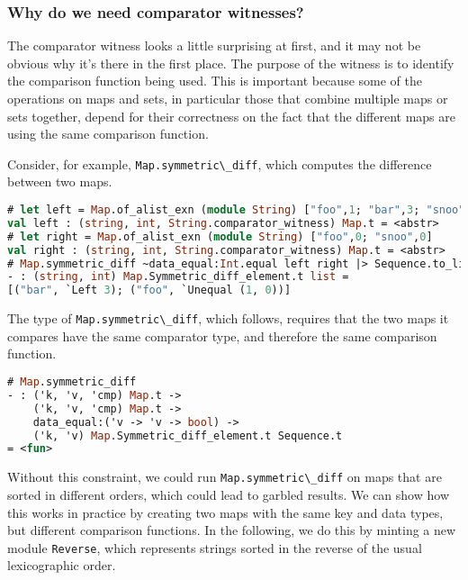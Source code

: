 \hypertarget{why-comparator-witnesses}{%
\subsubsection{Why do we need comparator
witnesses?}\label{why-comparator-witnesses}}

The comparator witness looks a little surprising at first, and it may
not be obvious why it's there in the first place. The purpose of the
witness is to identify the comparison function being used. This is
important because some of the operations on maps and sets, in particular
those that combine multiple maps or sets together, depend for their
correctness on the fact that the different maps are using the same
comparison function.

Consider, for example, \passthrough{\lstinline!Map.symmetric\_diff!},
which computes the difference between two maps.

\begin{lstlisting}[language=Caml]
# let left = Map.of_alist_exn (module String) ["foo",1; "bar",3; "snoo",0]
val left : (string, int, String.comparator_witness) Map.t = <abstr>
# let right = Map.of_alist_exn (module String) ["foo",0; "snoo",0]
val right : (string, int, String.comparator_witness) Map.t = <abstr>
# Map.symmetric_diff ~data_equal:Int.equal left right |> Sequence.to_list
- : (string, int) Map.Symmetric_diff_element.t list =
[("bar", `Left 3); ("foo", `Unequal (1, 0))]
\end{lstlisting}

The type of \passthrough{\lstinline!Map.symmetric\_diff!}, which
follows, requires that the two maps it compares have the same comparator
type, and therefore the same comparison function.

\begin{lstlisting}[language=Caml]
# Map.symmetric_diff
- : ('k, 'v, 'cmp) Map.t ->
    ('k, 'v, 'cmp) Map.t ->
    data_equal:('v -> 'v -> bool) ->
    ('k, 'v) Map.Symmetric_diff_element.t Sequence.t
= <fun>
\end{lstlisting}

Without this constraint, we could run
\passthrough{\lstinline!Map.symmetric\_diff!} on maps that are sorted in
different orders, which could lead to garbled results. We can show how
this works in practice by creating two maps with the same key and data
types, but different comparison functions. In the following, we do this
by minting a new module \passthrough{\lstinline!Reverse!}, which
represents strings sorted in the reverse of the usual lexicographic
order.


